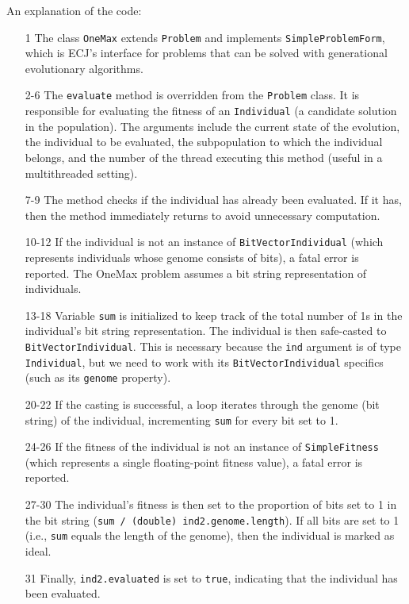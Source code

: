 An explanation of the code:

\begin{enumerate}
  \item[1] The class \texttt{OneMax} extends \texttt{Problem} and implements \texttt{SimpleProblemForm}, which is ECJ's interface for problems that can be solved with generational evolutionary algorithms.
  
  \item[2-6] The \texttt{evaluate} method is overridden from the \texttt{Problem} class. It is responsible for evaluating the fitness of an \texttt{Individual} (a candidate solution in the population). The arguments include the current state of the evolution, the individual to be evaluated, the subpopulation to which the individual belongs, and the number of the thread executing this method (useful in a multithreaded setting).
  
  \item[7-9] The method checks if the individual has already been evaluated. If it has, then the method immediately returns to avoid unnecessary computation.
  
  \item[10-12] If the individual is not an instance of \texttt{BitVectorIndividual} (which represents individuals whose genome consists of bits), a fatal error is reported. The OneMax problem assumes a bit string representation of individuals.
  
  \item[13-18] Variable \texttt{sum} is initialized to keep track of the total number of 1s in the individual's bit string representation. The individual is then safe-casted to \texttt{BitVectorIndividual}. This is necessary because the \texttt{ind} argument is of type \texttt{Individual}, but we need to work with its \texttt{BitVectorIndividual} specifics (such as its \texttt{genome} property).
  
  \item[20-22] If the casting is successful, a loop iterates through the genome (bit string) of the individual, incrementing \texttt{sum} for every bit set to 1.
  
  \item[24-26] If the fitness of the individual is not an instance of \texttt{SimpleFitness} (which represents a single floating-point fitness value), a fatal error is reported.
  
  \item[27-30] The individual's fitness is then set to the proportion of bits set to 1 in the bit string (\texttt{sum / (double) ind2.genome.length}). If all bits are set to 1 (i.e., \texttt{sum} equals the length of the genome), then the individual is marked as ideal.
  
  \item[31] Finally, \texttt{ind2.evaluated} is set to \texttt{true}, indicating that the individual has been evaluated.
\end{enumerate}

